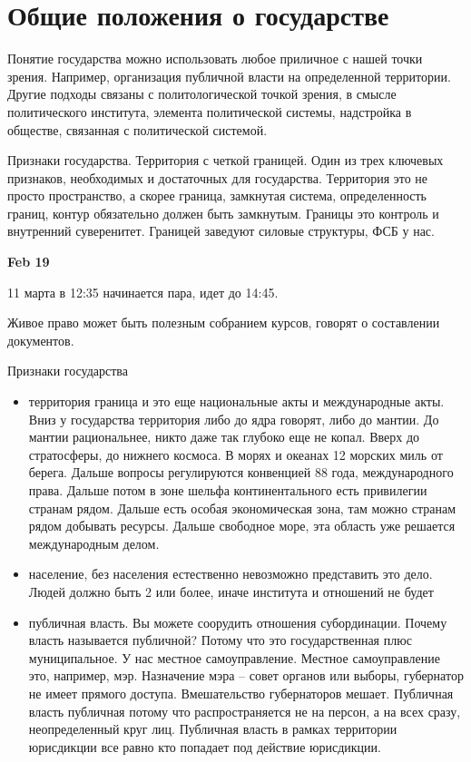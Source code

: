 \documentclass[a4paper, 12pt]{article}
\def\datee#1{\hfill\textbf{#1} \par}
\begin{document}
\section{Общие положения о государстве}
Понятие государства можно использовать любое приличное с нашей точки зрения. Например, организация публичной власти на определенной территории. Другие подходы связаны с политологической точкой зрения, в смысле политического института, элемента политической системы, надстройка в обществе, связанная с политической системой. 

Признаки государства. Территория с четкой границей. Один из трех ключевых признаков, необходимых и достаточных для государства. Территория это не просто пространство, а скорее граница, замкнутая система, определенность границ, контур обязательно должен быть замкнутым. Границы это контроль и внутренний суверенитет. Границей заведуют силовые структуры, ФСБ у нас. 

\datee{Feb 19}
11 марта в 12:35 начинается пара, идет до 14:45. 

Живое право может быть полезным собранием курсов, говорят о составлении документов. 

Признаки государства 
\begin{itemize}
\item территория граница и это еще национальные акты и международные акты. Вниз у государства территория либо до ядра говорят, либо до мантии. До мантии рациональнее, никто даже так глубоко еще не копал. Вверх до стратосферы, до нижнего космоса. В морях и океанах 12 морских миль от берега. Дальше вопросы регулируются конвенцией 88 года, международного права. Дальше потом в зоне шельфа континентального есть привилегии странам рядом. Дальше есть особая экономическая зона, там можно странам рядом добывать ресурсы. Дальше свободное море, эта область уже решается международным делом. 
\item население, без населения естественно невозможно представить это дело. Людей должно быть 2 или более, иначе института и отношений не будет 
\item публичная власть. Вы можете соорудить отношения субординации. Почему власть называется публичной? Потому что это государственная плюс муниципальное. У нас местное самоуправление. Местное самоуправление это, например, мэр. Назначение мэра -- совет органов или выборы, губернатор не имеет прямого доступа. Вмешательство губернаторов мешает. Публичная власть публичная потому что распространяется не на персон, а на всех сразу, неопределенный круг лиц. Публичная власть в рамках территории юрисдикции все равно кто попадает под действие юрисдикции. 
\end{itemize}
\end{document}
